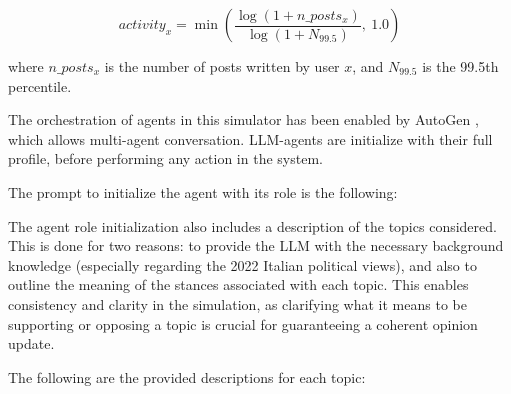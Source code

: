 \[
activity_x = \min\left( \frac{\log(1 + n\_posts_x)}{\log(1 + N_{99.5})},\ 1.0 \right)
\]

where $n\_posts_x$ is the number of posts written by user $x$, and $N_{99.5}$ is the 99.5th percentile.


\medskip
The orchestration of agents  in this simulator has been enabled by AutoGen \cite{pyautogen0.2.31, wu2023autogenenablingnextgenllm}, which allows multi-agent conversation.
LLM-agents are initialize with their full profile, before performing any action in the system. 

The prompt to initialize the agent with its role is the following: 


\medskip
The agent role initialization also includes a description of the topics considered.
This is done for two reasons: to provide the LLM with the necessary background knowledge (especially regarding the 2022 Italian political views), and also to outline the meaning of the stances associated with each topic.
This enables consistency and clarity in the simulation, as clarifying what it means to be supporting or opposing a topic is crucial for guaranteeing a coherent opinion update.

The following are the provided descriptions for each topic:

